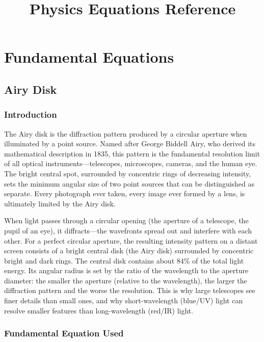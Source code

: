 \documentclass[11pt,openright]{book}
\title{Physics Equations Reference}
\author{}
\date{}
\begin{document}
\frontmatter
\maketitle
\tableofcontents
\mainmatter

\part{Fundamental Equations}



\chapter{Airy Disk}

\section*{Introduction}

The Airy disk is the diffraction pattern produced by a circular aperture when illuminated by a point source. Named after George Biddell Airy, who derived its mathematical description in 1835, this pattern is the fundamental resolution limit of all optical instruments---telescopes, microscopes, cameras, and the human eye. The bright central spot, surrounded by concentric rings of decreasing intensity, sets the minimum angular size of two point sources that can be distinguished as separate. Every photograph ever taken, every image ever formed by a lens, is ultimately limited by the Airy disk.

When light passes through a circular opening (the aperture of a telescope, the pupil of an eye), it diffracts---the wavefronts spread out and interfere with each other. For a perfect circular aperture, the resulting intensity pattern on a distant screen consists of a bright central disk (the Airy disk) surrounded by concentric bright and dark rings. The central disk contains about 84\% of the total light energy. Its angular radius is set by the ratio of the wavelength to the aperture diameter: the smaller the aperture (relative to the wavelength), the larger the diffraction pattern and the worse the resolution. This is why large telescopes see finer details than small ones, and why short-wavelength (blue/UV) light can resolve smaller features than long-wavelength (red/IR) light.
\section*{Fundamental Equation Used}
\end{document}
